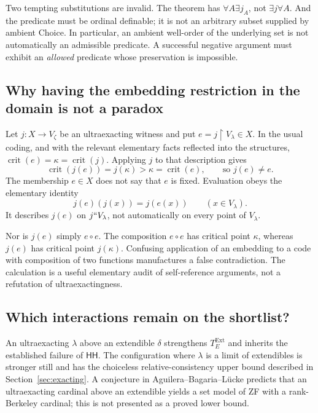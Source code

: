 \documentclass[11pt,letterpaper]{article}
\theoremstyle{definition}
\newcommand{\HH}{\mathsf{HH}}
\newcommand{\crit}{\operatorname{crit}}
\newcommand{\restr}{\mathbin{\upharpoonright}}
\begin{document}
Two tempting substitutions are invalid. The theorem has $\forall A\exists j_A$, not $\exists j\forall A$. And the predicate must be ordinal definable; it is not an arbitrary subset supplied by ambient Choice. In particular, an ambient well-order of the underlying set is not automatically an admissible predicate. A successful negative argument must exhibit an \emph{allowed} predicate whose preservation is impossible.

\subsection{Why having the embedding restriction in the domain is not a paradox}

Let $j:X\to V_\zeta$ be an ultraexacting witness and put $e=j\restr V_\lambda\in X$. In the usual coding, and with the relevant elementary facts reflected into the structures, $\crit(e)=\kappa=\crit(j)$. Applying $j$ to that description gives
\[
 \crit(j(e))=j(\kappa)>\kappa=\crit(e),
 \qquad\text{so }j(e)\neq e.
\]
The membership $e\in X$ does not say that $e$ is fixed. Evaluation obeys the elementary identity
\begin{equation}
 j(e)(j(x))=j(e(x))\qquad(x\in V_\lambda).
 \label{eq:selfcode}
\end{equation}
It describes $j(e)$ on $j``V_\lambda$, not automatically on every point of $V_\lambda$.

Nor is $j(e)$ simply $e\circ e$. The composition $e\circ e$ has critical point $\kappa$, whereas $j(e)$ has critical point $j(\kappa)$. Confusing application of an embedding to a code with composition of two functions manufactures a false contradiction. The calculation is a useful elementary audit of self-reference arguments, not a refutation of ultraexactingness. \cite{abl,abgl,dimonte}

\subsection{Which interactions remain on the shortlist?}

An ultraexacting $\lambda$ above an extendible $\delta$ strengthens $T_E^{\mathrm{Ext}}$ and inherits the established failure of $\HH$. The configuration where $\lambda$ is a limit of extendibles is stronger still and has the choiceless relative-consistency upper bound described in Section~\ref{sec:exacting}. A conjecture in Aguilera--Bagaria--L\"ucke predicts that an ultraexacting cardinal above an extendible yields a set model of ZF with a rank-Berkeley cardinal; this is not presented as a proved lower bound. \cite[Conjecture~6.9]{abl}
\end{document}
